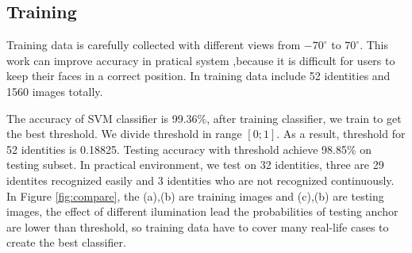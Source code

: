 \documentclass[journal, twocolumn]{IEEEtran}
\begin{document}
\subsection{Training}
Training data is carefully collected with different views from $-70^\circ$ to $70^\circ$. This work can improve accuracy in pratical system ,because it is difficult for users to keep their faces in a correct position. In training data include 52 identities and 1560 images totally.

The accuracy of SVM classifier is 99.36\%, after training classifier, we train to get the best threshold. We divide threshold in range $[0;1]$. As a result, threshold for 52 identities is 0.18825. Testing accuracy with threshold achieve 98.85\% on testing subset. In practical environment, we test on 32 identities, three are 29 identites recognized easily and 3 identities who are not recognized continuously. In Figure \ref{fig:compare}, the (a),(b) are training images and (c),(b) are testing images, the effect of different ilumination lead the probabilities of testing anchor are lower than threshold, so training data have to cover many real-life cases to create the best classifier.  
\end{document}
